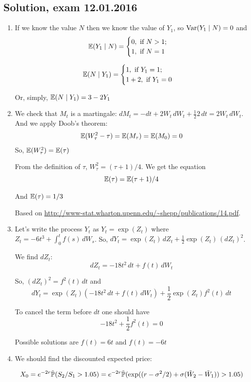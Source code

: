 \documentclass[12pt, a4paper]{article}
\begin{document}
\subsection{Solution, exam 12.01.2016}

\begin{enumerate}
\item If we know the value $N$ then we know the value of $Y_1$, so $\Var(Y_1 \mid N)=0$ and
\[
\E(Y_1 \mid N) = \begin{cases}
0, \text{ if } N > 1; \\
1, \text{ if } N = 1
\end{cases}
\]

\[
\E(N \mid Y_1) = \begin{cases}
1, \text{ if } Y_1 = 1; \\
1 + 2, \text{ if } Y_1 = 0
\end{cases}
\]

Or, simply, $\E(N \mid Y_1)=3-2Y_1$

\item We check that $M_t$ is a martingale: $dM_t= -dt +2W_t \,dW_t + \frac{1}{2}2\,dt=2W_t\, dW_t$. 
And we apply Doob's theorem:
\[
\E(W_{\tau}^2-\tau)=\E(M_{\tau})=\E(M_0)=0
\]
So, $\E(W_{\tau}^2)=\E(\tau)$

From the definition of $\tau$, $W_{\tau}^2=(\tau + 1)/4$. We get the equation
\[
\E(\tau)=\E(\tau+1)/4
\]

And $\E(\tau)=1/3$

Based on \url{http://www-stat.wharton.upenn.edu/~shepp/publications/14.pdf}.

\item Let's write the process $Y_t$ as $Y_t=\exp(Z_t)$ where $Z_t = -6t^3 + \int_0^t f(s)\, dW_s$. So, $dY_t = \exp(Z_t) \, dZ_t + \frac{1}{2}\exp(Z_t) \, (dZ_t)^2$.

We find $dZ_t$:
\[
dZ_t = -18t^2 \, dt + f(t) \, dW_t
\]

So, $(dZ_t)^2 = f^2(t) \, dt$ and
\[
dY_t=\exp(Z_t) (-18t^2 \, dt + f(t) \, dW_t) + \frac{1}{2}\exp(Z_t) f^2(t) \, dt
\]

To cancel the term before $dt$ one should have
\[
-18t^2 + \frac{1}{2} f^2(t) = 0
\]

Possible solutions are $f(t)=6t$ and $f(t)=-6t$

\item We should find the discounted expected price:

\[
X_0 = e^{-2r}\tilde\P(S_2/S_1 > 1.05) = e^{-2r} \tilde\P( \exp((r-\sigma^2/2) + \sigma (\tilde W_2 - \tilde W_1)) > 1.05)
\]


\end{enumerate}
\end{document}

